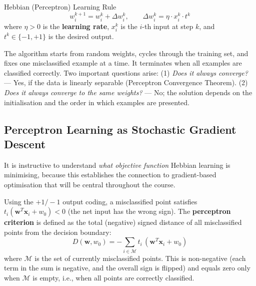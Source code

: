 \documentclass[11pt,a4paper]{article}
\newcommand{\term}[1]{\textcolor{DefGreen}{\textbf{#1}}}
\begin{document}
\begin{defbox}{Hebbian (Perceptron) Learning Rule}
\[
w_i^{k+1} = w_i^k + \Delta w_i^k, \qquad \Delta w_i^k = \eta \cdot x_i^k \cdot t^k
\]
where $\eta > 0$ is the \term{learning rate}, $x_i^k$ is the $i$-th input at step $k$, and $t^k \in \{-1, +1\}$ is the desired output.
\end{defbox}

\begin{notebox}
The algorithm starts from random weights, cycles through the training set, and fixes one misclassified example at a time. It terminates when all examples are classified correctly. Two important questions arise: (1) \emph{Does it always converge?} — Yes, if the data is linearly separable (Perceptron Convergence Theorem). (2) \emph{Does it always converge to the same weights?} — No; the solution depends on the initialisation and the order in which examples are presented.
\end{notebox}

\subsection{Perceptron Learning as Stochastic Gradient Descent}
\label{sec:percSGD}

It is instructive to understand \emph{what objective function} Hebbian learning is minimising, because this establishes the connection to gradient-based optimisation that will be central throughout the course.

Using the $+1/-1$ output coding, a misclassified point satisfies $t_i(\mathbf{w}^T\mathbf{x}_i + w_0) < 0$ (the net input has the wrong sign). The \term{perceptron criterion} is defined as the total (negative) signed distance of all misclassified points from the decision boundary:
\[
D(\mathbf{w}, w_0) = -\sum_{i \in \mathcal{M}} t_i\,(\mathbf{w}^T\mathbf{x}_i + w_0)
\]
where $\mathcal{M}$ is the set of currently misclassified points. This is non-negative (each term in the sum is negative, and the overall sign is flipped) and equals zero only when $\mathcal{M}$ is empty, i.e., when all points are correctly classified.
\end{document}
